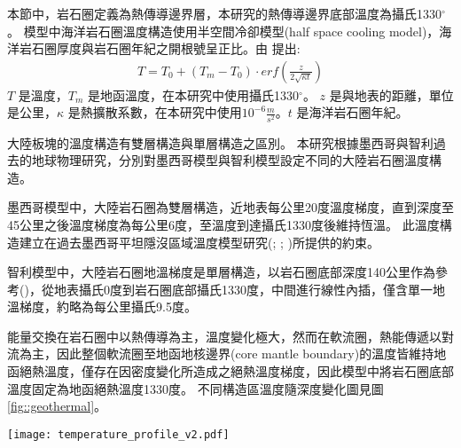 

本節中，岩石圈定義為熱傳導邊界層，本研究的熱傳導邊界底部溫度為攝氏1330$^{\circ}$。
模型中海洋岩石圈溫度構造使用半空間冷卻模型(half space cooling model)，海洋岩石圈厚度與岩石圈年紀之開根號呈正比。由 \citealp{davis1974}提出:
\begin{align}
T=T_0+(T_m-T_0)\cdot erf(\frac{z}{2\sqrt{\kappa t}}) \label{eq:Half Space Model}
\end{align}
$T$ 是溫度，$T_m$ 是地函溫度，在本研究中使用攝氏1330$^{\circ}$。
$z$ 是與地表的距離，單位是公里，$\kappa$ 是熱擴散系數，在本研究中使用$10^{-6} \frac{m}{s^2}$。$t$ 是海洋岩石圈年紀。

大陸板塊的溫度構造有雙層構造與單層構造之區別。
本研究根據墨西哥與智利過去的地球物理研究，分別對墨西哥模型與智利模型設定不同的大陸岩石圈溫度構造。

墨西哥模型中，大陸岩石圈為雙層構造，近地表每公里20度溫度梯度，直到深度至45公里之後溫度梯度為每公里6度，至溫度到達攝氏1330度後維持恆溫。
此溫度構造建立在過去墨西哥平坦隱沒區域溫度模型研究(\citealp{Manea2005}; \citealp{Manea2011Thermal}; \citealp{Manea2011Curie})所提供的約束。

智利模型中，大陸岩石圈地溫梯度是單層構造，以岩石圈底部深度140公里作為參考(\citealp{perez2008})，從地表攝氏0度到岩石圈底部攝氏1330度，中間進行線性內插，僅含單一地溫梯度，約略為每公里攝氏9.5度。

能量交換在岩石圈中以熱傳導為主，溫度變化極大，然而在軟流圈，熱能傳遞以對流為主，因此整個軟流圈至地函地核邊界(core mantle boundary)的溫度皆維持地函絕熱溫度，僅存在因密度變化所造成之絕熱溫度梯度，因此模型中將岩石圈底部溫度固定為地函絕熱溫度1330度。
不同構造區溫度隨深度變化圖見圖\ref{fig::geothermal}。
\begin{figure*}[ht!]
    \centering
    \texttt{[image: temperature\_profile\_v2.pdf]}
    \caption[本研究使用之模型地下溫度剖面圖]{本研究使用之模型地下溫度剖面圖，左圖為智利模型，右圖為墨西哥模型。藍色實線為海洋岩石圈地溫梯度，由式\ref{eq:Half Space Model}與海洋岩石圈年紀決定。咖啡色實線為大陸岩石圈地溫梯度，智利模型大陸岩石圈為單層構造，墨西哥模型大陸岩石圈為雙層構造。圖中並沒有考量絕熱地溫梯度。}
    \label{fig::geothermal}
\end{figure*}


